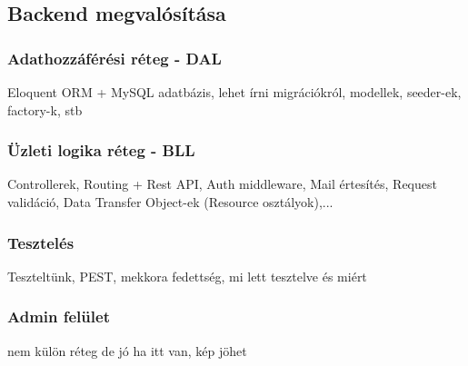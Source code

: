 \subsection{Backend megvalósítása}

\subsubsection{Adathozzáférési réteg - DAL}

Eloquent ORM + MySQL adatbázis, lehet írni migrációkról, modellek, seeder-ek, factory-k, stb

\subsubsection{Üzleti logika réteg - BLL}

Controllerek, Routing + Rest API, Auth middleware, Mail értesítés, Request validáció, Data Transfer Object-ek (Resource osztályok),...

\subsubsection{Tesztelés}

Teszteltünk, PEST, mekkora fedettség, mi lett tesztelve és miért

\subsubsection{Admin felület}

nem külön réteg de jó ha itt van, kép jöhet